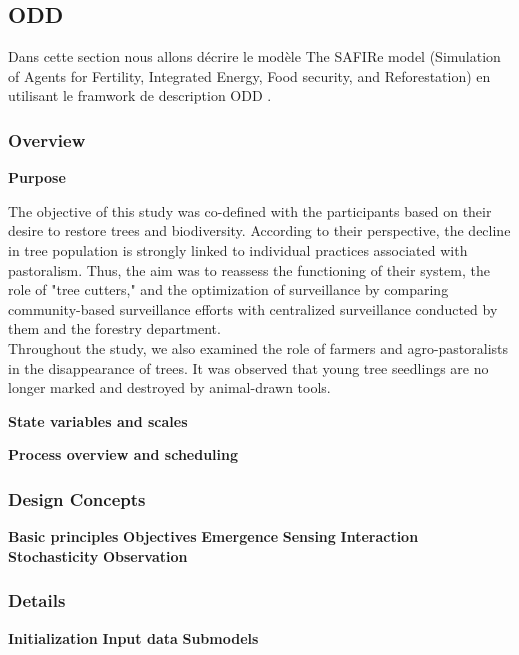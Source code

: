 \documentclass{article}
\begin{document}
\subsection{ODD }

    Dans cette section nous allons décrire le modèle The SAFIRe model (Simulation of Agents for Fertility, Integrated Energy, Food security, and Reforestation) en utilisant le framwork de description ODD \cite{grimm_standard_2006,grimm_odd_2010,grimm_odd_2020}.

    \subsubsection{Overview}

        \textbf{Purpose}

        The objective of this study was co-defined with the participants based on their desire to restore trees and biodiversity. According to their perspective, the decline in tree population is strongly linked to individual practices associated with pastoralism. Thus, the aim was to reassess the functioning of their system, the role of "tree cutters," and the optimization of surveillance by comparing community-based surveillance efforts with centralized surveillance conducted by them and the forestry department.\\

        Throughout the study, we also examined the role of farmers and agro-pastoralists in the disappearance of trees. It was observed that young tree seedlings are no longer marked and destroyed by animal-drawn tools.

        \textbf{State variables and scales}

    
        \textbf{Process overview and scheduling}
        \textbf{}
        \textbf{}
        \textbf{}
        \textbf{}


    \subsubsection{Design Concepts}
        \textbf{Basic principles}
        \textbf{Objectives}
        \textbf{Emergence}
        \textbf{Sensing}
        \textbf{Interaction}
        \textbf{Stochasticity}
        \textbf{Observation}

    \subsubsection{Details}
        \textbf{Initialization}
        \textbf{Input data}
        \textbf{Submodels}
\end{document}
